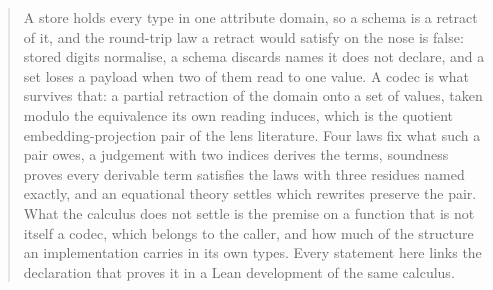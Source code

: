 \begin{abstract}
A store holds every type in one attribute domain, so a schema is a retract of it, and the
round-trip law a retract would satisfy on the nose is false: stored digits normalise, a schema
discards names it does not declare, and a set loses a payload when two of them read to one value. A codec is what survives that: a partial retraction of the
domain onto a set of values, taken modulo the equivalence its own reading induces, which is the
quotient embedding-projection pair \cite{ep-pairs} of the lens literature. Four laws fix what such
a pair owes, a judgement with two indices derives the terms, soundness proves every derivable term
satisfies the laws with three residues named exactly, and an equational theory settles which
rewrites preserve the pair. What the calculus does not settle is the premise on a function that is
not itself a codec, which belongs to the caller, and how much of the structure an implementation
carries in its own types. Every statement here links the declaration that proves it in a Lean
development of the same calculus.
\end{abstract}

